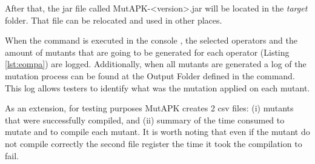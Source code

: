 After that, the  jar file called MutAPK-<version>.jar will be located in the \textit{target} folder. That file can be relocated and used in other places. 

When the command is executed in the console ,  the selected operators and the amount of mutants that are going to be generated for each operator (Listing \ref{lst:eompa}) are logged. Additionally, when all mutants are generated a log of the mutation process can be found at the Output Folder defined in the command. This log allows testers to identify what was the mutation applied on each mutant.

As an extension, for testing purposes MutAPK creates 2 csv files: (i) mutants that were successfully compiled, and (ii) summary of the time consumed to mutate and to compile each mutant. It is worth noting that even if the mutant do not compile correctly the second file register the time it took the compilation to fail.






















